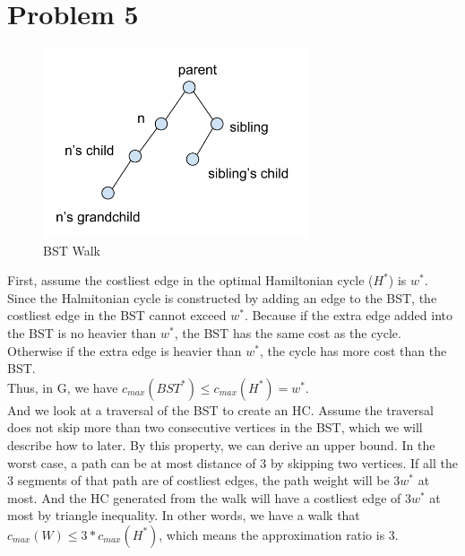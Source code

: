 \documentclass[titlepage, paper=a4, fontsize=11pt]{scrartcl} %
\numberwithin{equation}{section} %
\numberwithin{figure}{section} %
\numberwithin{table}{section} %
\numberwithin{figure}{section}
\begin{document}
\section*{Problem 5}
\begin{figure}[!ht]
    \centering
    \includegraphics[width=0.7\textwidth]{P5.pdf}
    \caption{BST Walk}
    \label{fig:bst-walk}
\end{figure}
First, assume the costliest edge in the optimal Hamiltonian cycle ($H^*$) is $w^*$. Since the Halmitonian cycle is constructed by adding an edge to the BST, the costliest edge in the BST cannot exceed $w^*$. Because if the extra edge added into the BST is no heavier than $w^*$, the BST has the same cost as the cycle. Otherwise if the extra edge is heavier than $w^*$, the cycle has more cost than the BST. \\
Thus, in G, we have $c_{max}(BST^*) \leq c_{max}(H^*) = w^*$. \\

And we look at a traversal of the BST to create an HC. Assume the traversal does not skip more than two consecutive vertices in the BST, which we will describe how to later. By this property, we can derive an upper bound. In the worst case, a path can be at most distance of 3 by skipping two vertices. If all the 3 segments of that path are of costliest edges, the path weight will be $3w^*$ at most. And the HC generated from the walk will have a costliest edge of $3w^*$ at most by triangle inequality. In other words, we have a walk that $c_{max}(W) \leq 3*c_{max}(H^*)$, which means the approximation ratio is 3. \\
\end{document}
